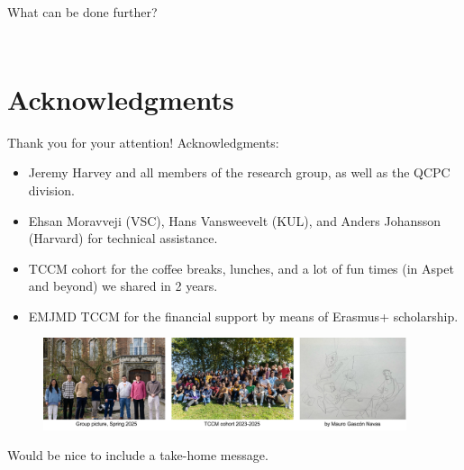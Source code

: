 \documentclass[11pt,t]{beamer}
\begin{document}
\begin{frame}{What can be done further?}
\begin{columns}[t]
\begin{column}{.35\textwidth}
\begin{figure}
			\end{figure}
		\end{column}
	\end{columns}
\end{frame}



\section{Acknowledgments}
\begin{frame}{Thank you for your attention!}
	\footnotesize
	Acknowledgments:
	\begin{itemize}
	\item Jeremy Harvey and all members of the research group, as well as the QCPC division.
	\item Ehsan Moravveji (VSC), Hans Vansweevelt (KUL), and Anders Johansson (Harvard) for technical assistance.
	\item TCCM cohort for the coffee breaks, lunches, and a lot of fun times (in Aspet and beyond) we shared in 2 years.
	\item EMJMD TCCM for the financial support by means of Erasmus+ scholarship.
	\end{itemize}
	\begin{figure}
		\centering
		\includegraphics[width=0.95\textwidth]{Figures/acknowledgments.pdf}
	\end{figure}
	\small
	Would be nice to include a take-home message.
\end{frame}
\end{document}
